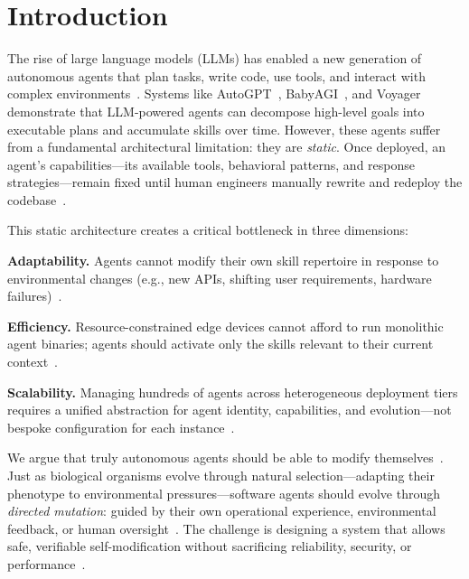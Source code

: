 \documentclass{article}
\begin{document}

\tableofcontents


\section{Introduction}
\label{sec:introduction}

The rise of large language models (LLMs) has enabled a new generation of autonomous agents that plan tasks, write code, use tools, and interact with complex environments~\cite{wang2023survey, xi2023rise}. Systems like AutoGPT~\cite{auto_gpt}, BabyAGI~\cite{babyagi}, and Voyager~\cite{wang2023voyager} demonstrate that LLM-powered agents can decompose high-level goals into executable plans and accumulate skills over time. However, these agents suffer from a fundamental architectural limitation: they are \textit{static}. Once deployed, an agent's capabilities---its available tools, behavioral patterns, and response strategies---remain fixed until human engineers manually rewrite and redeploy the codebase~\cite{wooldridge2009introduction}.

This static architecture creates a critical bottleneck in three dimensions:

\textbf{Adaptability.} Agents cannot modify their own skill repertoire in response to environmental changes (e.g., new APIs, shifting user requirements, hardware failures)~\cite{ge2023metagpt}. 

\textbf{Efficiency.} Resource-constrained edge devices cannot afford to run monolithic agent binaries; agents should activate only the skills relevant to their current context~\cite{shi2016edge}.

\textbf{Scalability.} Managing hundreds of agents across heterogeneous deployment tiers requires a unified abstraction for agent identity, capabilities, and evolution---not bespoke configuration for each instance~\cite{guo2024llm_multi_agents}.

We argue that truly autonomous agents should be able to modify themselves~\cite{vonneumann1966self}. Just as biological organisms evolve through natural selection---adapting their phenotype to environmental pressures---software agents should evolve through \textit{directed mutation}: guided by their own operational experience, environmental feedback, or human oversight~\cite{koza1992gp}. The challenge is designing a system that allows safe, verifiable self-modification without sacrificing reliability, security, or performance~\cite{rushby1995critical}.
\end{document}

